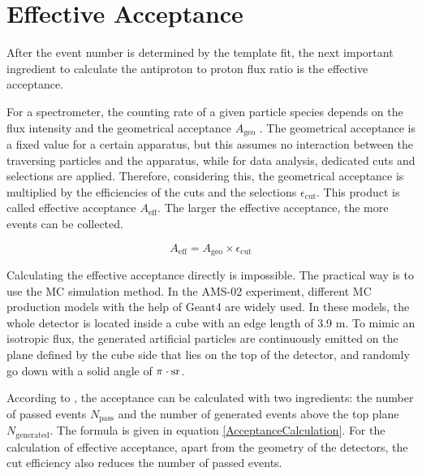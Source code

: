 
\section{Effective Acceptance} \label{EffectiveAcceptanceSection}

After the event number is determined by the template fit, the next important ingredient to calculate the antiproton to proton flux ratio is the effective acceptance.    \par

For a spectrometer, the counting rate of a given particle species depends on the flux intensity and the geometrical acceptance $A_\mathrm{geo}$ \cite{SULLIVAN19715}. The geometrical acceptance is a fixed value for a certain apparatus, but this assumes no interaction between the traversing particles and the apparatus, while for data analysis, dedicated cuts and selections are applied. Therefore, considering this, the geometrical acceptance is multiplied by the efficiencies of the cuts and the selections $\epsilon_\mathrm{cut}$. This product is called effective acceptance $A_\mathrm{eff}$. The larger the effective acceptance, the more events can be collected. \par

\begin{equation}
\label{EffectiveAcceptanceDefination}
A_\mathrm{eff}=A_\mathrm{geo} \times \epsilon_\mathrm{cut} 
\end{equation}

Calculating the effective acceptance directly is impossible. The practical way is to use the MC simulation method. In the AMS-02 experiment, different MC production models with the help of Geant4 are widely used. In these models, the whole detector is located inside a cube with an edge length of 3.9 m. To mimic an isotropic flux, the generated artificial particles are continuously emitted on the plane defined by the cube side that lies on the top of the detector, and randomly go down with a solid angle of $\pi \cdot \rm{sr}$.  \par

According to \cite{SULLIVAN19715}, the acceptance can be calculated with two ingredients: the number of passed events $N_\mathrm{pass}$ and the number of generated events above the top plane $N_\mathrm{generated}$. The formula is given in equation \ref{AcceptanceCalculation}. For the calculation of effective acceptance, apart from the geometry of the detectors, the cut efficiency also reduces the number of passed events.

